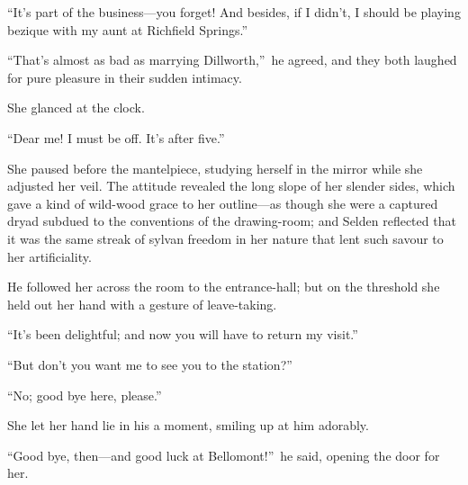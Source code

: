 \documentclass[12pt,a4paper]{book}
\begin{document}
``It's part of the business---you forget! And besides, if I didn't,
I should be playing bezique with my aunt at Richfield Springs.''





``That's almost as bad as marrying Dillworth,''\ he agreed, and they
both laughed for pure pleasure in their sudden intimacy.





She glanced at the clock.





``Dear me! I must be off. It's after five.''





She paused before the mantelpiece, studying herself in the mirror
while she adjusted her veil. The attitude revealed the long slope
of her slender sides, which gave a kind of wild-wood grace to her
outline---as though she were a captured dryad subdued to the
conventions of the drawing-room; and Selden reflected that it was
the same streak of sylvan freedom in her nature that lent such
savour to her artificiality.





He followed her across the room to the entrance-hall; but on the
threshold she held out her hand with a gesture of leave-taking.





``It's been delightful; and now you will have to return my visit.''





``But don't you want me to see you to the station?''





``No; good bye here, please.''





She let her hand lie in his a moment, smiling up at him adorably.





``Good bye, then---and good luck at Bellomont!''\ he said, opening
the door for her.
\end{document}
